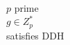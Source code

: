 \documentclass[varwidth,convert={size=1000x}]{standalone}
\begin{document}
$p$ prime\\
$g \in Z_p^*$\\
satisfies DDH
\end{document}
